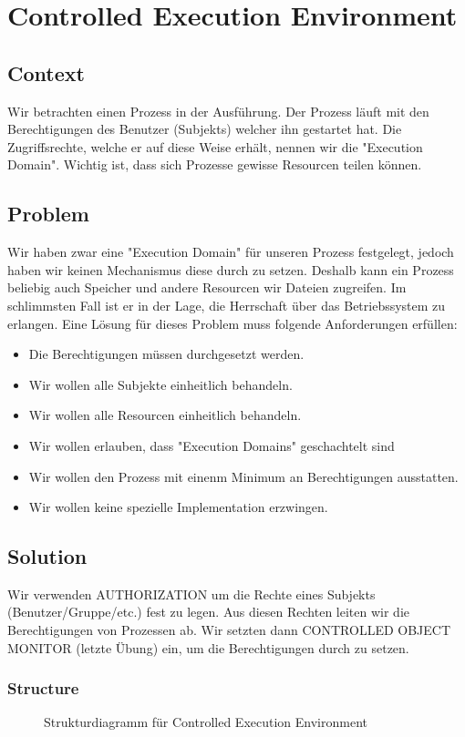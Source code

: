 \chapter{Controlled Execution Environment}

\section{Context}
Wir betrachten einen Prozess in der Ausführung. Der Prozess läuft mit den Berechtigungen des Benutzer (Subjekts) welcher ihn gestartet hat. Die Zugriffsrechte, welche er auf diese Weise erhält, nennen wir die "Execution Domain". Wichtig ist, dass sich Prozesse gewisse Resourcen teilen können.

\section{Problem}
Wir haben zwar eine "Execution Domain" für unseren Prozess festgelegt, jedoch haben wir keinen Mechanismus diese durch zu setzen. Deshalb kann ein Prozess beliebig auch Speicher und andere Resourcen wir Dateien zugreifen. Im schlimmsten Fall ist er in der Lage, die Herrschaft über das Betriebssystem zu erlangen. Eine Lösung für dieses Problem muss folgende Anforderungen erfüllen:
\begin{itemize}
  \item Die Berechtigungen müssen durchgesetzt werden.
  \item Wir wollen alle Subjekte einheitlich behandeln.
  \item Wir wollen alle Resourcen einheitlich behandeln.
  \item Wir wollen erlauben, dass "Execution Domains" geschachtelt sind
  \item Wir wollen den Prozess mit einenm Minimum an Berechtigungen ausstatten.
  \item Wir wollen keine spezielle Implementation erzwingen.
\end{itemize}

\section{Solution}
Wir verwenden AUTHORIZATION um die Rechte eines Subjekts (Benutzer/Gruppe/etc.) fest zu legen. Aus diesen Rechten leiten wir die Berechtigungen von Prozessen ab. Wir setzten dann CONTROLLED OBJECT MONITOR (letzte Übung) ein, um die Berechtigungen durch zu setzen.

\subsection{Structure}
\begin{figure}[H]
  \centering
  
  \caption{Strukturdiagramm f\"ur Controlled Execution Environment}
\end{figure}

